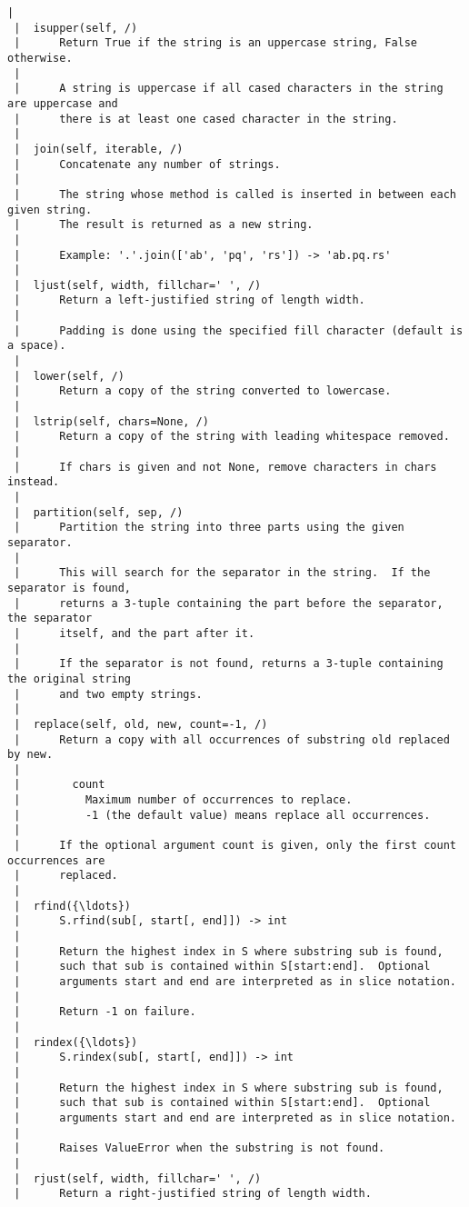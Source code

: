 \begin{Verbatim}[commandchars=\\\{\},frame=single,framerule=0.3mm,rulecolor=\color{cellframecolor}]
 |  
 |  isupper(self, /)
 |      Return True if the string is an uppercase string, False otherwise.
 |      
 |      A string is uppercase if all cased characters in the string are uppercase and
 |      there is at least one cased character in the string.
 |  
 |  join(self, iterable, /)
 |      Concatenate any number of strings.
 |      
 |      The string whose method is called is inserted in between each given string.
 |      The result is returned as a new string.
 |      
 |      Example: '.'.join(['ab', 'pq', 'rs']) -> 'ab.pq.rs'
 |  
 |  ljust(self, width, fillchar=' ', /)
 |      Return a left-justified string of length width.
 |      
 |      Padding is done using the specified fill character (default is a space).
 |  
 |  lower(self, /)
 |      Return a copy of the string converted to lowercase.
 |  
 |  lstrip(self, chars=None, /)
 |      Return a copy of the string with leading whitespace removed.
 |      
 |      If chars is given and not None, remove characters in chars instead.
 |  
 |  partition(self, sep, /)
 |      Partition the string into three parts using the given separator.
 |      
 |      This will search for the separator in the string.  If the separator is found,
 |      returns a 3-tuple containing the part before the separator, the separator
 |      itself, and the part after it.
 |      
 |      If the separator is not found, returns a 3-tuple containing the original string
 |      and two empty strings.
 |  
 |  replace(self, old, new, count=-1, /)
 |      Return a copy with all occurrences of substring old replaced by new.
 |      
 |        count
 |          Maximum number of occurrences to replace.
 |          -1 (the default value) means replace all occurrences.
 |      
 |      If the optional argument count is given, only the first count occurrences are
 |      replaced.
 |  
 |  rfind({\ldots})
 |      S.rfind(sub[, start[, end]]) -> int
 |      
 |      Return the highest index in S where substring sub is found,
 |      such that sub is contained within S[start:end].  Optional
 |      arguments start and end are interpreted as in slice notation.
 |      
 |      Return -1 on failure.
 |  
 |  rindex({\ldots})
 |      S.rindex(sub[, start[, end]]) -> int
 |      
 |      Return the highest index in S where substring sub is found,
 |      such that sub is contained within S[start:end].  Optional
 |      arguments start and end are interpreted as in slice notation.
 |      
 |      Raises ValueError when the substring is not found.
 |  
 |  rjust(self, width, fillchar=' ', /)
 |      Return a right-justified string of length width.

\end{Verbatim}
